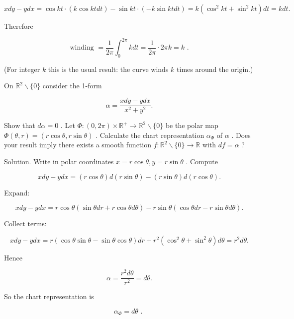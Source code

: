 \documentclass[10pt]{article}
\begin{document}
\[
{xdy} - {ydx} = \cos {kt} \cdot  \left( {k\cos {ktdt}}\right)  - \sin {kt} \cdot  \left( {-k\sin {ktdt}}\right)  = k\left( {{\cos }^{2}{kt} + {\sin }^{2}{kt}}\right) {dt} = {kdt}.
\]

Therefore

\[
\text{ winding } = \frac{1}{2\pi }{\int }_{0}^{2\pi }{kdt} = \frac{1}{2\pi } \cdot  {2\pi k} = k\text{ . }
\]

(For integer \(k\) this is the usual result: the curve winds \(k\) times around the origin.)

\begin{problem}[title=PROBLEM 3 (6 POINTS)]
On \({\mathbb{R}}^{2} \smallsetminus  \{ 0\}\) consider the 1-form

\[
\alpha  = \frac{{xdy} - {ydx}}{{x}^{2} + {y}^{2}}.
\]

Show that \({d\alpha } = 0\) . Let \(\Phi  : \left( {0,{2\pi }}\right)  \times  {\mathbb{R}}^{ + } \rightarrow  {\mathbb{R}}^{2} \smallsetminus  \{ 0\}\) be the polar map \(\Phi \left( {\theta ,r}\right)  = \left( {r\cos \theta ,r\sin \theta }\right)\) . Calculate the chart representation \({\alpha }_{\Phi }\) of \(\alpha\) . Does your result imply there exists a smooth function \(f : {\mathbb{R}}^{2} \smallsetminus  \{ 0\}  \rightarrow  \mathbb{R}\) with \({df} = \alpha\) ?
\end{problem}

Solution. Write in polar coordinates \(x = r\cos \theta ,y = r\sin \theta\) . Compute

\[
{xdy} - {ydx} = \left( {r\cos \theta }\right) d\left( {r\sin \theta }\right)  - \left( {r\sin \theta }\right) d\left( {r\cos \theta }\right) .
\]

Expand:

\[
{xdy} - {ydx} = r\cos \theta \left( {\sin {\theta dr} + r\cos {\theta d\theta }}\right)  - r\sin \theta \left( {\cos {\theta dr} - r\sin {\theta d\theta }}\right) .
\]

Collect terms:

\[
{xdy} - {ydx} = r\left( {\cos \theta \sin \theta  - \sin \theta \cos \theta }\right) {dr} + {r}^{2}\left( {{\cos }^{2}\theta  + {\sin }^{2}\theta }\right) {d\theta } = {r}^{2}{d\theta }.
\]

Hence

\[
\alpha  = \frac{{r}^{2}{d\theta }}{{r}^{2}} = {d\theta }.
\]

So the chart representation is

\[
{\alpha }_{\Phi } = {d\theta }\text{ . }
\]
\end{document}
